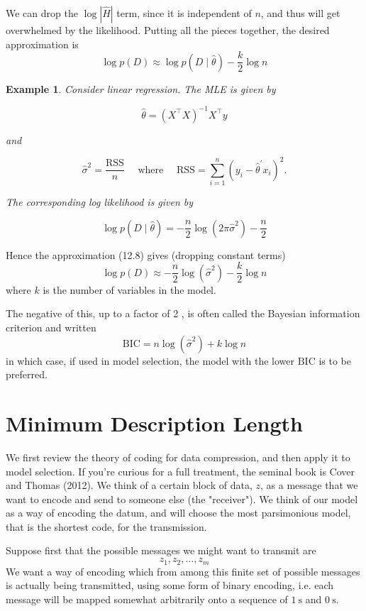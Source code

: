 \documentclass[11pt]{article}
\theoremstyle{plain} %
\newtheorem{example}[theorem]{Example}
\theoremstyle{remark}
\begin{document}
 We can drop the $\log |\hat{H}|$ term, since it is independent of $n$,
  and thus will get overwhelmed by the likelihood. Putting all the pieces together, the desired approximation is
$$
\log p(D) \approx \log p(D \mid \hat{\theta})-\frac{k}{2} \log n
$$

\begin{example}
  Consider linear regression. The MLE is given by

$$
\hat{\theta}=\left(X^\top X\right)^{-1} X^\top y
$$

and

$$
\hat{\sigma}^{2}=\frac{\mathrm{RSS}}{n} \quad \text { where } \quad \mathrm{RSS}=\sum_{i=1}^{n}\left(y_{i}-\hat{\theta}^{\prime} x_{i}\right)^{2} .
$$

The corresponding log likelihood is given by

$$
\log p(D \mid \hat{\theta})=-\frac{n}{2} \log \left(2 \pi \hat{\sigma}^{2}\right)-\frac{n}{2}
$$
\end{example}

Hence the approximation (12.8) gives (dropping constant terms)
$$
\log p(D) \approx-\frac{n}{2} \log \left(\hat{\sigma}^{2}\right)-\frac{k}{2} \log n
$$
where $k$ is the number of variables in the model.

 The negative of this, up to a factor of 2 , is often called the Bayesian
  information criterion and written
$$
\mathrm{BIC}=n \log \left(\hat{\sigma}^{2}\right)+k \log n
$$
in which case, if used in model selection, the model with the lower
$\mathrm{BIC}$ is to be preferred.

\section{Minimum Description Length}
We first review the theory of coding for data compression, and then
  apply it to model selection. If you're curious for a full treatment, the seminal book is Cover and
  Thomas (2012). We think of a certain block of data, $z$, as a message that we want to
  encode and send to someone else (the "receiver"). We think of our model as a way of encoding the datum, and will choose
  the most parsimonious model, that is the shortest code, for the transmission.

Suppose first that the possible messages we might want to transmit are
$$
z_{1}, z_{2}, \ldots, z_{m}
$$
We want a way of encoding which from among this finite set of possible
  messages is actually being transmitted, using some form of binary encoding,
  i.e. each message will be mapped somewhat arbitrarily onto a sequence of $1
  \mathrm{~s}$ and $0 \mathrm{~s}$.
\end{document}
